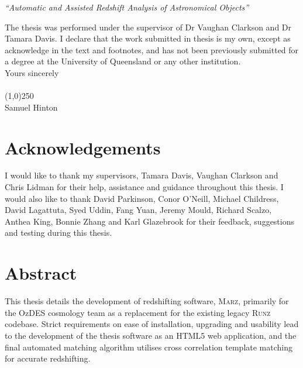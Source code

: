 \documentclass[titlesmallcaps, examinerscopy, copyrightpage]{uqthesis}
\newcommand{\thesisname}{\textsc{Marz}}
\newcommand{\runz}{\textsc{Runz}}
\begin{document}
\begin{center}
  \emph{``Automatic and Assisted Redshift Analysis of Astronomical Objects''}
\end{center}

\noindent The thesis was performed under the supervisor of Dr Vaughan Clarkson and Dr Tamara Davis. I declare that the work
submitted in thesis is my own, except as acknowledge in the text and footnotes, and has not been
previously submitted for a degree at the University of Queensland or any other institution. \\

\noindent Yours sincerely \\ \\ 

\noindent \line(1,0){250} \\

\noindent Samuel Hinton


\chapter{Acknowledgements}

I would like to thank my supervisors, Tamara Davis, Vaughan Clarkson and Chris Lidman for their help, assistance and guidance throughout this thesis. I would also like to thank David Parkinson, Conor O'Neill, Michael Childress, David Lagattuta, Syed Uddin, Fang Yuan, Jeremy Mould, Richard Scalzo, Anthea King, Bonnie Zhang and Karl Glazebrook for their feedback, suggestions and testing during this thesis.


\chapter{Abstract}

This thesis details the development of redshifting software, \thesisname{}, primarily for the OzDES cosmology team as a replacement for the existing legacy \runz{} codebase. Strict requirements on ease of installation, upgrading and usability lead to the development of the thesis software as an HTML5 web application, and the final automated matching algorithm utilises cross correlation template matching for accurate redshifting.
\end{document}
